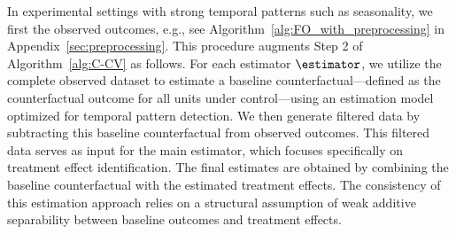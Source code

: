 \begin{remark}
    \label{rem:proprocessing}
    In experimental settings with strong temporal patterns such as seasonality, we first \emph{\preprocess} the observed outcomes, e.g., see Algorithm~\ref{alg:FO_with_preprocessing} in Appendix~\ref{sec:preprocessing}. This procedure augments Step 2 of Algorithm~\ref{alg:C-CV} as follows. For each estimator $\estimator$, we utilize the complete observed dataset to estimate a baseline counterfactual—defined as the counterfactual outcome for all units under control—using an estimation model optimized for temporal pattern detection. We then generate filtered data by subtracting this baseline counterfactual from observed outcomes. This filtered data serves as input for the main estimator, which focuses specifically on treatment effect identification. The final estimates are obtained by combining the baseline counterfactual with the estimated treatment effects. The consistency of this estimation approach relies on a structural assumption of weak additive separability between baseline outcomes and treatment effects.
\end{remark}